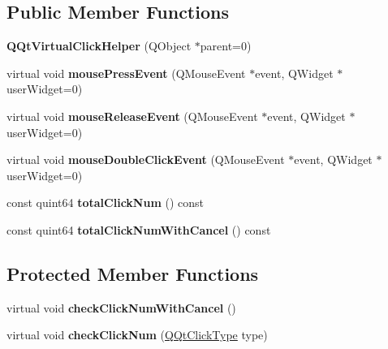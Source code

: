 \subsection*{Public Member Functions}
\begin{DoxyCompactItemize}
\item 
\mbox{\label{class_q_qt_virtual_click_helper_a2f6d38e44008741482f16bb21b7e7250}} 
{\bfseries Q\+Qt\+Virtual\+Click\+Helper} (Q\+Object $\ast$parent=0)
\item 
\mbox{\label{class_q_qt_virtual_click_helper_a995f2928e1f44cdd67a63d6f3f644fa3}} 
virtual void {\bfseries mouse\+Press\+Event} (Q\+Mouse\+Event $\ast$event, Q\+Widget $\ast$user\+Widget=0)
\item 
\mbox{\label{class_q_qt_virtual_click_helper_a022f23479fc6098249017c55461f24ab}} 
virtual void {\bfseries mouse\+Release\+Event} (Q\+Mouse\+Event $\ast$event, Q\+Widget $\ast$user\+Widget=0)
\item 
\mbox{\label{class_q_qt_virtual_click_helper_af0a2d37a125788acbb0ea2b4ac11e51b}} 
virtual void {\bfseries mouse\+Double\+Click\+Event} (Q\+Mouse\+Event $\ast$event, Q\+Widget $\ast$user\+Widget=0)
\item 
\mbox{\label{class_q_qt_virtual_click_helper_a4dfa1069b0578747b6401455ca7c9036}} 
const quint64 {\bfseries total\+Click\+Num} () const
\item 
\mbox{\label{class_q_qt_virtual_click_helper_a3c86752f34262d91b3522489850b9b44}} 
const quint64 {\bfseries total\+Click\+Num\+With\+Cancel} () const
\end{DoxyCompactItemize}
\subsection*{Protected Member Functions}
\begin{DoxyCompactItemize}
\item 
\mbox{\label{class_q_qt_virtual_click_helper_a97a9607ca2f620d217009c63fda507f5}} 
virtual void {\bfseries check\+Click\+Num\+With\+Cancel} ()
\item 
\mbox{\label{class_q_qt_virtual_click_helper_aeb9ed0deb4ef8119fdc15516a94af52a}} 
virtual void {\bfseries check\+Click\+Num} (\mbox{\hyperlink{class_q_qt_virtual_click_helper_ace6c0c9b072e51f2cb3ff1316404b764}{Q\+Qt\+Click\+Type}} type)
\end{DoxyCompactItemize}
